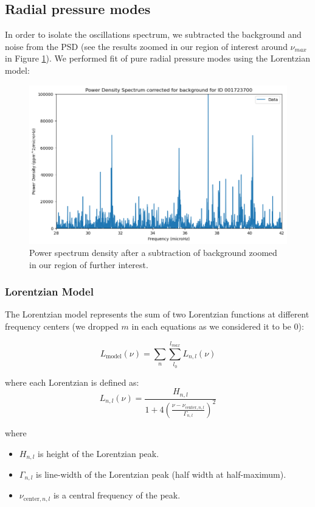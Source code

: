 \documentclass[12pt]{article}
\begin{document}
\subsection{Radial pressure modes}
In order to isolate the oscillations spectrum, we subtracted the background and noise from the PSD (see the results zoomed in our region of interest around $\nu_{max}$ in Figure \ref{fig:wB}). We performed fit of pure radial pressure modes using the Lorentzian model: 

\begin{figure}[H]
  \centering
  \includegraphics[width=\linewidth]{withoutB.png}
  \caption{Power spectrum density after a subtraction of background zoomed in our region of further interest.}
  \label{fig:wB}
\end{figure}

\subsubsection*{Lorentzian Model}
The Lorentzian model represents the sum of two Lorentzian functions at different frequency centers (we dropped $m$ in each equations as we considered it to be 0):

\begin{equation}\label{eq:Lmodel}
  L_{\text{model}}(\nu) = \sum_n \sum_{l_0}^{l_{max}} L_{n,l}(\nu)  
\end{equation}

where each Lorentzian is defined as:
\begin{equation}
    L_{n,l}(\nu) = \frac{H_{n,l}}{1 + 4 \left( \frac{\nu - \nu_{\text{center},n,l}}{\Gamma_{n,l}} \right)^2}
\end{equation}

where
\begin{itemize}
    \item $H_{n,l}$ is height of the Lorentzian peak.
    \item $\Gamma_{n,l}$ is line-width of the Lorentzian peak (half width at half-maximum).
    \item $\nu_{\text{center},n,l}$ is a central frequency of the peak.
\end{itemize}
\end{document}
